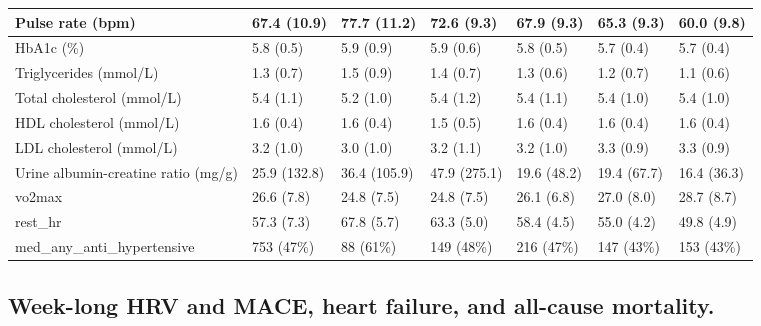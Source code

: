 \documentclass[
  a4paper,
  headsepline=true,
  open=any]{scrbook}
\begin{document}
\begin{table}
{\begin{tabular}{l|l|l|l|l|l|l}
\hline
Pulse rate (bpm) & 67.4 (10.9) & 77.7 (11.2) & 72.6 (9.3) & 67.9 (9.3) & 65.3 (9.3) & 60.0 (9.8)\\
\hline
HbA1c (\%) & 5.8 (0.5) & 5.9 (0.9) & 5.9 (0.6) & 5.8 (0.5) & 5.7 (0.4) & 5.7 (0.4)\\
\hline
Triglycerides (mmol/L) & 1.3 (0.7) & 1.5 (0.9) & 1.4 (0.7) & 1.3 (0.6) & 1.2 (0.7) & 1.1 (0.6)\\
\hline
Total cholesterol (mmol/L) & 5.4 (1.1) & 5.2 (1.0) & 5.4 (1.2) & 5.4 (1.1) & 5.4 (1.0) & 5.4 (1.0)\\
\hline
HDL cholesterol (mmol/L) & 1.6 (0.4) & 1.6 (0.4) & 1.5 (0.5) & 1.6 (0.4) & 1.6 (0.4) & 1.6 (0.4)\\
\hline
LDL cholesterol (mmol/L) & 3.2 (1.0) & 3.0 (1.0) & 3.2 (1.1) & 3.2 (1.0) & 3.3 (0.9) & 3.3 (0.9)\\
\hline
Urine albumin-creatine ratio (mg/g) & 25.9 (132.8) & 36.4 (105.9) & 47.9 (275.1) & 19.6 (48.2) & 19.4 (67.7) & 16.4 (36.3)\\
\hline
vo2max & 26.6 (7.8) & 24.8 (7.5) & 24.8 (7.5) & 26.1 (6.8) & 27.0 (8.0) & 28.7 (8.7)\\
\hline
rest\_hr & 57.3 (7.3) & 67.8 (5.7) & 63.3 (5.0) & 58.4 (4.5) & 55.0 (4.2) & 49.8 (4.9)\\
\hline
med\_any\_anti\_hypertensive & 753 (47\%) & 88 (61\%) & 149 (48\%) & 216 (47\%) & 147 (43\%) & 153 (43\%)\\
\hline
\end{tabular}}
\end{table}

\hypertarget{week-long-hrv-and-mace-heart-failure-and-all-cause-mortality.}{%
\subsection{Week-long HRV and MACE, heart failure, and all-cause
mortality.}\label{week-long-hrv-and-mace-heart-failure-and-all-cause-mortality.}}
\end{document}
